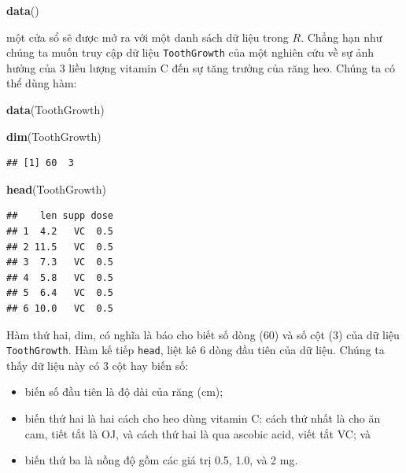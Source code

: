 \documentclass[
]{book}
\newenvironment{Shaded}{\begin{snugshade}}{\end{snugshade}}
\newcommand{\KeywordTok}[1]{\textcolor[rgb]{0.13,0.29,0.53}{\textbf{#1}}}
\newcommand{\NormalTok}[1]{#1}
\providecommand{\tightlist}{%
  \setlength{\itemsep}{0pt}\setlength{\parskip}{0pt}}
\begin{document}
\begin{Shaded}
\begin{Highlighting}[]
\KeywordTok{data}\NormalTok{()}
\end{Highlighting}
\end{Shaded}

một cửa sổ sẽ được mở ra với một danh sách dữ liệu trong \(R\). Chẳng hạn như chúng ta muốn truy cập dữ liệu \texttt{ToothGrowth} của một nghiên cứu về sự ảnh hưởng của 3 liều lượng vitamin C đến sự tăng trưởng của răng heo. Chúng ta có thể dùng hàm:

\begin{Shaded}
\begin{Highlighting}[]
\KeywordTok{data}\NormalTok{(ToothGrowth)}
\end{Highlighting}
\end{Shaded}

\begin{Shaded}
\begin{Highlighting}[]
\KeywordTok{dim}\NormalTok{(ToothGrowth)}
\end{Highlighting}
\end{Shaded}

\begin{verbatim}
## [1] 60  3
\end{verbatim}

\begin{Shaded}
\begin{Highlighting}[]
\KeywordTok{head}\NormalTok{(ToothGrowth)}
\end{Highlighting}
\end{Shaded}

\begin{verbatim}
##    len supp dose
## 1  4.2   VC  0.5
## 2 11.5   VC  0.5
## 3  7.3   VC  0.5
## 4  5.8   VC  0.5
## 5  6.4   VC  0.5
## 6 10.0   VC  0.5
\end{verbatim}

Hàm thứ hai, dim, có nghĩa là báo cho biết số dòng (60) và số cột (3) của dữ liệu \texttt{ToothGrowth}. Hàm kế tiếp \texttt{head}, liệt kê 6 dòng đầu tiên của dữ liệu. Chúng ta thấy dữ liệu này có 3 cột hay biến số:

\begin{itemize}
\tightlist
\item
  biến số đầu tiên là độ dài của răng (cm);
\item
  biến thứ hai là hai cách cho heo dùng vitamin C: cách thứ nhất là cho ăn cam, tiết tắt là OJ, và cách thứ hai là qua ascobic acid, viết tắt VC; và
\item
  biến thứ ba là nồng độ gồm các giá trị 0.5, 1.0, và 2 mg.
\end{itemize}
\end{document}
